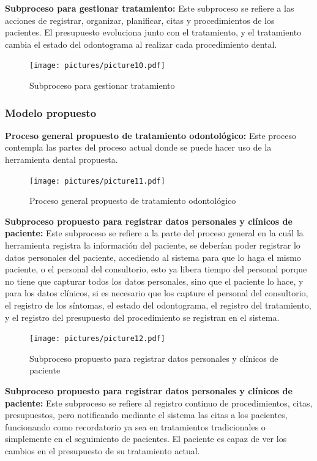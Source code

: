 \noindent\textbf{Subproceso para gestionar tratamiento:} Este subproceso se refiere a las acciones de registrar, organizar, planificar, citas y procedimientos de los pacientes. El presupuesto evoluciona junto con el tratamiento, y el tratamiento cambia el estado del odontograma al realizar cada procedimiento dental.

\begin{figure}[H]
\centering
\centerline{\texttt{[image: pictures/picture10.pdf]}}
\caption{Subproceso para gestionar tratamiento}
\end{figure}

\subsubsection{Modelo propuesto}

\noindent\textbf{Proceso general propuesto de tratamiento odontológico:} Este proceso contempla las partes del proceso actual donde se puede hacer uso de la herramienta dental propuesta.

\begin{figure}[H]
\centering
\centerline{\texttt{[image: pictures/picture11.pdf]}}
\caption{Proceso general propuesto de tratamiento odontológico}
\end{figure}


\noindent\textbf{Subproceso propuesto para registrar datos personales y clínicos de paciente:} Este subproceso se refiere a la parte del proceso general en la cuál la herramienta registra la información del paciente, se deberían poder registrar lo datos personales del paciente, accediendo al sistema para que lo haga el mismo paciente, o el personal del consultorio, esto ya libera tiempo del personal porque no tiene que capturar todos los datos personales, sino que el paciente lo hace, y para los datos clínicos, si es necesario que los capture el personal del consultorio, el registro de los síntomas, el estado del odontograma, el registro del tratamiento, y el registro del presupuesto del procedimiento se registran en el sistema.

\begin{figure}[H]
\centering
\centerline{\texttt{[image: pictures/picture12.pdf]}}
\caption{Subproceso propuesto para registrar datos personales y clínicos de paciente}
\end{figure}

\noindent\textbf{Subproceso propuesto para registrar datos personales y clínicos de paciente:} Este subproceso se refiere al registro continuo de procedimientos, citas, presupuestos, pero notificando mediante el sistema las citas a los pacientes, funcionando como recordatorio ya sea en tratamientos tradicionales o simplemente en el seguimiento de pacientes. El paciente es capaz de ver los cambios en el presupuesto de su tratamiento actual.

